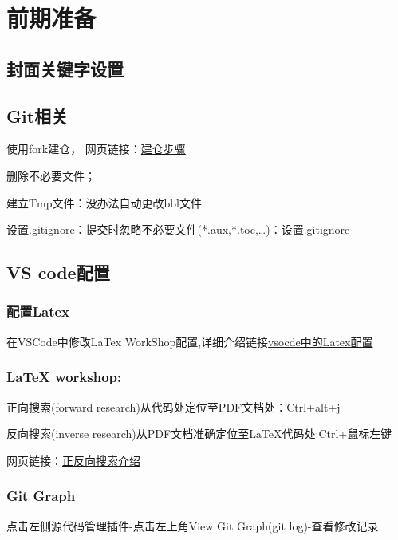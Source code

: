 \documentclass[engineeringmaster]{hquThesis}
\begin{document}
\makecover
% 
% 

\frontmatter{
    
    \tableofcontents
}

\mainmatter
\chapter{前期准备}
\section{封面关键字设置}
\section{Git相关}
使用fork建仓，
网页链接：\href{https://docs.github.com/en/repositories/creating-and-managing-repositories/creating-a-template-repository}{建仓步骤}

删除不必要文件；

建立Tmp文件：没办法自动更改bbl文件

设置.gitignore：提交时忽略不必要文件(*.aux,*.toc,\dots)：\href{https://blog.csdn.net/hjc_042043/article/details/135965334}{设置.gitignore}
\section{VS code配置}
\subsection*{配置Latex}
在VSCode中修改LaTex WorkShop配置,详细介绍链接\href{https://zhuanlan.zhihu.com/p/166523064}{vsocde中的Latex配置}

\subsection*{LaTeX workshop: }

正向搜索(forward research)从代码处定位至PDF文档处：Ctrl+alt+j

反向搜索(inverse research)从PDF文档准确定位至LaTeX代码处:Ctrl+鼠标左键

网页链接：\href{https://github.com/James-Yu/LaTeX-Workshop/wiki/View#synctex}{正反向搜索介绍}
\subsection*{Git Graph}
点击左侧源代码管理插件-点击左上角View Git Graph(git log)-查看修改记录
\end{document}
